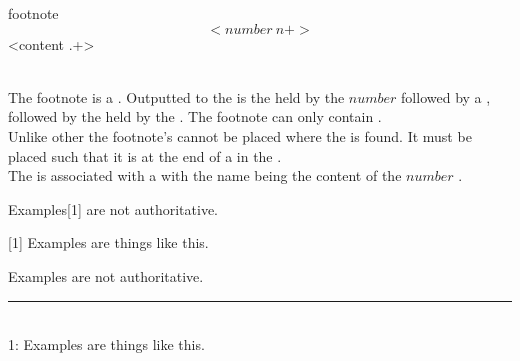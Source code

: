 \begin{identifier}{footnote}
\[<number ~n+>\] <content .+>
\end{identifier}
 \\

The footnote is a . Outputted to the  is the  held by the \inline$number$  followed by a , followed by the  held by the . The footnote can only contain . \\

Unlike other  the footnote's  cannot be placed where the  is found. It must be placed such that it is at the end of a  in the .\\

The  is associated with a  with the name being the content of the \inline$number$ . \\

\begin{examples}
  \begin{examplesource}
    Examples[1] are not authoritative.
    
    [1] Examples are things like this.
  \end{examplesource}
  \begin{exampleoutput}
    Examples\raisebox{.4ex}{\scriptsize \hyperref[footnote:ex1]{[1]}} are not authoritative. \\
    \rule{0.2\textwidth}{1pt} \\
    \label{footnote:ex1}1: Examples are things like this.
  \end{exampleoutput}
\end{examples}

